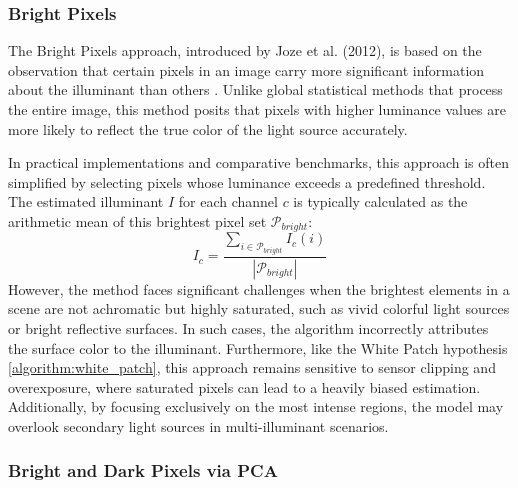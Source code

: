\subsubsection{Bright Pixels}
\label{algorithm:bright_pixels}

The Bright Pixels approach, introduced by Joze et al. (2012), is based on the observation that certain pixels in an image carry more significant information about the illuminant than others \cite{bright_pixels}. Unlike global statistical methods that process the entire image, this method posits that pixels with higher luminance values are more likely to reflect the true color of the light source accurately.

In practical implementations and comparative benchmarks, this approach is often simplified by selecting pixels whose luminance exceeds a predefined threshold. The estimated illuminant $I$ for each channel $c$ is typically calculated as the arithmetic mean of this brightest pixel set $\mathcal{P}_{bright}$:
\begin{equation}
I_c = \frac{\sum_{i \in \mathcal{P}_{bright}} I_c(i)}{|\mathcal{P}_{bright}|}
\end{equation}
However, the method faces significant challenges when the brightest elements in a scene are not achromatic but highly saturated, such as vivid colorful light sources or bright reflective surfaces. In such cases, the algorithm incorrectly attributes the surface color to the illuminant. Furthermore, like the White Patch hypothesis \ref{algorithm:white_patch}, this approach remains sensitive to sensor clipping and overexposure, where saturated pixels can lead to a heavily biased estimation. Additionally, by focusing exclusively on the most intense regions, the model may overlook secondary light sources in multi-illuminant scenarios.

\subsubsection{Bright and Dark Pixels via PCA}
\label{algorithm:bright_pixels_pca}


